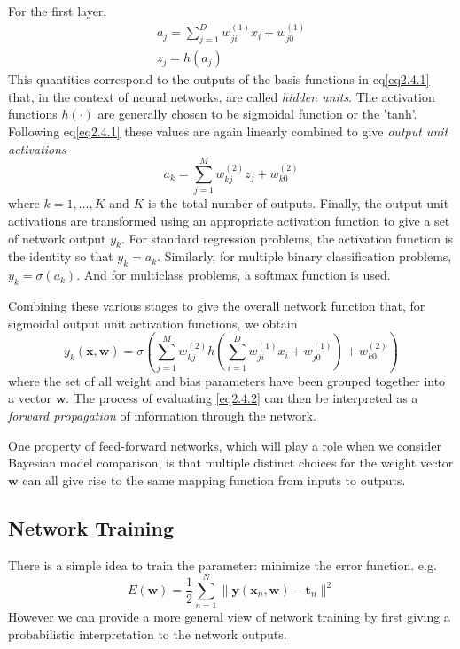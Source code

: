 \documentclass[a4paper]{book}
\newcommand{\mbf}{\mathbf}
\newcommand{\ww}{\mbf w}
\newcommand{\ttt}{\mbf t}
\newcommand{\xx}{\mbf x}
\newcommand{\yy}{\mbf y}
\begin{document}
For the first layer,
\begin{gather}\label{}
a_j=\sum_{j=1}^Dw_{ji}^{(1)}x_i+w_{j0}^{(1)} \\
z_j=h(a_j)
\end{gather}
This quantities correspond to the outputs of the basis functions in eq\ref{eq2.4.1} that, in the context of neural networks, are called \textit{hidden units}. The activation functions $h(\cdot)$  are generally chosen to be sigmoidal function or the 'tanh'. Following eq\ref{eq2.4.1} these values are again linearly combined to give \textit{output unit activations}
\begin{equation}\label{}
  a_k=\sum_{j=1}^{M}w_{kj}^{(2)}z_j+w_{k0}^{(2)}
\end{equation}
where $k=1,\dots,K$ and $K$ is the total number of outputs. Finally, the output unit activations are transformed using an appropriate activation function to give a set of network output $y_k$. For standard regression problems, the activation function is the identity so that $y_k=a_k$. Similarly, for multiple binary classification problems, $y_k =\sigma(a_k)$. And for multiclass problems, a softmax function is used.

Combining these various stages to give the overall network function that, for sigmoidal output unit activation functions, we obtain
\begin{equation}\label{eq2.4.2}
  y_k(\xx,\ww) = \sigma(\sum_{j=1}^{M}w_{kj}^{(2)}h(\sum_{i=1}^{D}w_{ji}^{(1)}x_i+w_{j0}^{(1)})+w_{k0}^{(2)})
\end{equation}
where the set of all weight and bias parameters have been grouped together into a vector $\ww$. The process of evaluating \ref{eq2.4.2} can then be interpreted as a \textit{forward propagation} of information through the network.

One property of feed-forward networks, which will play a role when we consider Bayesian model comparison, is that multiple distinct choices for the weight vector
$\ww$ can all give rise to the same mapping function from inputs to outputs.

\subsection{Network Training}
There is a simple idea to train the parameter: minimize the error function. e.g.
\begin{equation}\label{eq2.4.3}
  E(\ww) = \frac12\sum_{n=1}^N\|\yy(\xx_n,\ww)-\ttt_n\|^2
\end{equation}
However we can provide a more general view of network training by first giving a probabilistic interpretation to the network outputs.
\end{document}
